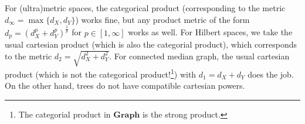 \documentclass[a4paper]{article}
\theoremstyle{definition}
\DeclareMathOperator\Hom{Hom}
\begin{document}
%
%


For (ultra)metric spaces, the categorical product (corresponding to the metric $d_\infty=\max\{d_X,d_Y\}$) works fine, but any product metric of the form $d_p=(d_X^p+d_Y^p)^{\frac1p}$ for $p\in[1,\infty]$ works as well.
For Hilbert spaces, we take the usual cartesian product (which is also the categorial product), which corresponds to the metric $d_2=\sqrt{d_X^2+d_Y^2}$.
For connected median graph, the usual cartesian product (which is not the categorical product!\footnote{The categorial product in $\mathbf{Graph}$ is the strong product.}) with $d_1=d_X+d_Y$ does the job.
On the other hand, trees do not have compatible cartesian powers.


\end{document}
